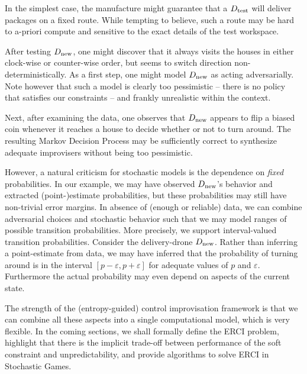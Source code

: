 In the simplest case, the manufacture might guarantee that a
${D_{\text{test}}}$ will deliver packages on a fixed route. While tempting to
believe, such a route may be hard to a-priori compute and sensitive to
the exact details of the test workspace.

After testing ${D_{\text{new}}}$, one might discover that it always visits
the houses in either clock-wise or counter-wise order, but seems to
switch direction non-deterministically.  As a first step, one might
model ${D_{\text{new}}}$ as acting adversarially. Note however that such a
model is clearly too pessimistic -- there is no policy that satisfies
our constraints -- and frankly unrealistic within the context.

Next, after examining the data, one observes that ${D_{\text{new}}}$ appears
to flip a biased coin whenever it reaches a house to decide whether or
not to turn around. The resulting Markov Decision Process may be
sufficiently correct to synthesize adequate improvisers without
being too pessimistic.

 However, a natural criticism for stochastic
models is the dependence on \emph{fixed} probabilities.  In our
example, we may have observed ${D_{\text{new}}}$'s behavior and extracted
(point-)estimate probabilities, but these probabilities may still have
non-trivial error margins.  In absence of (enough or reliable) data,
we can combine adversarial choices and stochastic behavior such that
we may model ranges of possible transition probabilities.  More
precisely, we support interval-valued transition probabilities.
Consider the delivery-drone ${D_{\text{new}}}$. Rather than inferring a
point-estimate from data, we may have inferred that the probability of
turning around is in the interval $[p - \varepsilon, p + \varepsilon]$
for adequate values of $p$ and $\varepsilon$.  Furthermore the actual
probability may even depend on aspects of the current state.

The strength of the (entropy-guided) control improvisation framework
is that we can combine all these aspects into a single computational
model, which is very flexible. In the coming sections, we shall
formally define the ERCI problem, highlight that there is the implicit
trade-off between performance of the soft constraint and
unpredictability, and provide algorithms to solve ERCI in Stochastic
Games.




